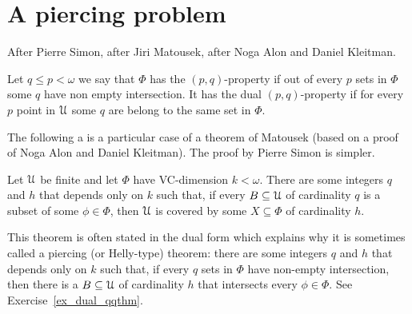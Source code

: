 \documentclass[sputnik.tex]{subfiles}
\begin{document}
\def\vc{{\footnotesize VC}}
\def\nip{{\footnotesize NIP}}


\def\medrel#1{\parbox[t]{6ex}{$\displaystyle\hfil #1$}}
\def\ceq#1#2#3{\parbox[t]{25ex}{$\displaystyle #1$}\medrel{#2}{$\displaystyle #3$}}

\def\mr{\color{brown}}
\def\gr{\color{green}}


\chapter{A piercing problem}\label{qq}

After Pierre Simon, after Jiri Matousek, after Noga Alon and Daniel Kleitman.

Let $q\le p<\omega$ we say that $\Phi$ has the $(p,q)$-property if out of every $p$ sets in $\Phi$ some $q$ have non empty intersection.
It has the dual $(p,q)$-property if for every $p$ point in $\EuScript U$ some $q$ are belong to the same set in $\Phi$.


The following a is a particular case of a theorem of  Matousek (based on a proof of Noga Alon and Daniel Kleitman).
The proof by Pierre Simon is simpler.

\begin{theorem}\label{thm_qq}
Let $\EuScript U$ be finite and let $\Phi$ have \vc-dimension $k<\omega$.
There are some integers $q$ and $h$ that depends only on $k$ such that, if every $B\subseteq\EuScript U$ of cardinality $q$ is a subset of some $\phi\in\Phi$, then $\EuScript U$ is covered by some $X\subseteq\Phi$ of cardinality $h$.
\end{theorem}

This theorem is often stated in the dual form which explains why it is sometimes called a piercing (or Helly-type) theorem: there are some integers $q$ and $h$ that depends only on $k$ such that, if every $q$ sets in $\Phi$ have non-empty intersection, then there is a $B\subseteq\EuScript U$ of cardinality $h$ that intersects every $\phi\in\Phi$.
See Exercise~\ref{ex_dual_qqthm}.
\end{document}
